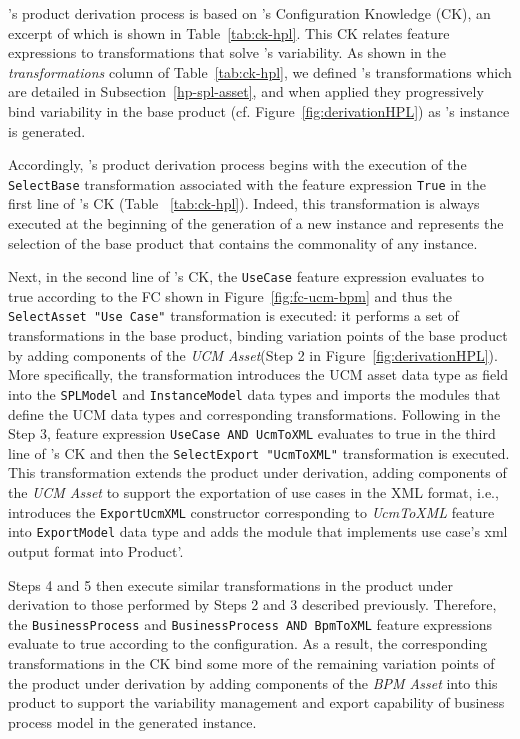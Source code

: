 
\hpl's product derivation process is based on \hpl's Configuration Knowledge (CK), an excerpt of which is shown in Table~\ref{tab:ck-hpl}.  This CK relates feature expressions to transformations that solve \hpl{}'s variability.  As shown in the \textit{transformations} column of Table~\ref{tab:ck-hpl}, we defined \hpl's transformations which are detailed in Subsection~\ref{hp-spl-asset}, and when applied they progressively bind variability in the base product (cf. Figure~\ref{fig:derivationHPL}) as \hpl's instance is generated.

Accordingly, \hpl's product derivation process begins with the execution of the \texttt{SelectBase} transformation associated with the feature expression \texttt{True} in the first line of \hpl's CK (Table ~\ref{tab:ck-hpl}). Indeed, this transformation is always executed at the beginning of the generation of a new \hpl{} instance and represents the selection of the base product that contains the commonality of any \hpl{} instance.

Next, in the second line of \hpl's CK, the \texttt{UseCase} feature expression evaluates to true according to the FC shown in Figure~\ref{fig:fc-ucm-bpm} and thus the \texttt{SelectAsset "Use Case"} transformation is executed: it performs a set of transformations in the base product, binding variation points of the base product by adding components of the \textit{UCM Asset}(Step 2 in Figure~\ref{fig:derivationHPL}).  More specifically, the transformation introduces the UCM asset data type as field into the \texttt{SPLModel} and \texttt{InstanceModel} data types and imports the modules that define the UCM data types and corresponding transformations.  Following in the Step 3, feature expression \texttt{UseCase AND UcmToXML} evaluates to true in the third line of \hpl's CK and then the \texttt{SelectExport "UcmToXML"} transformation is executed. This transformation extends the product under derivation, adding components of the \textit{UCM Asset} to support the exportation of use cases in the XML format, i.e., introduces the \texttt{ExportUcmXML} constructor corresponding to \textit{UcmToXML} feature into \texttt{ExportModel} data type and adds the module that implements use case's xml output format into Product'.

Steps 4 and 5 then execute similar transformations in the product under derivation to those performed by Steps 2 and 3 described previously.  Therefore, the \texttt{BusinessProcess} and \texttt{BusinessProcess AND BpmToXML} feature expressions evaluate to true according to the configuration. As a result, the corresponding transformations in the CK bind some more of the remaining variation points of the product under derivation by adding components of the \textit{BPM Asset} into this product to support the variability management and export capability of business process model in the generated \hpl{} instance.

